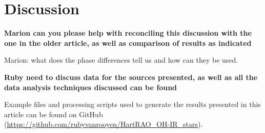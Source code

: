 \section{Discussion}
\label{sec:discussion}

{\color {red}

\textbf{Marion can you please help with reconciling this discussion with the one in the older article, as well as comparison of results as indicated}

Marion: what does the phase differences tell us and how can they be used.


\textbf{Ruby need to discuss data for the sources presented, as well as all the data analysis techniques discussed can be found}
}
Example files and processing scripts used to generate the results presented in this article can be found on GitHub (\mbox{\url{https://github.com/rubyvanrooyen/HartRAO_OH-IR_stars}}).